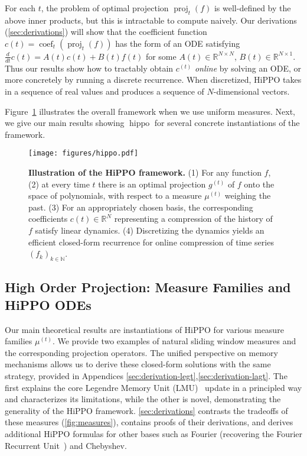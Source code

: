 \documentclass{article}
\newcommand{\R}{\mathbb{R}}
\newcommand{\N}{\mathbb{N}}
\DeclareMathOperator{\proj}{proj}
\DeclareMathOperator{\coef}{coef}
\DeclareMathOperator{\hippo}{hippo}
\begin{document}
For each $t$, the problem of optimal projection
$\proj_t(f)$ is well-defined by the above inner products,
but this is intractable to compute naively.
Our derivations (\cref{sec:derivations}) will show that
the coefficient function $c(t) = \coef_t(\proj_t(f))$ has the form of an ODE
satisfying $\frac{d}{dt} c(t) = A(t) c(t) + B(t) f(t)$ for some $A(t) \in \R^{N \times N}$, $B(t) \in \R^{N \times 1}$.
Thus our results show how to tractably obtain $c^{(t)}$ \emph{online} by solving an
ODE, or more concretely by running a discrete recurrence.
When discretized, HiPPO takes in a sequence of real values and produces a
sequence of $N$-dimensional vectors.






Figure~\ref{fig:framework} illustrates the overall framework when we use uniform measures.
Next, we give our main results showing $\hippo$ for several concrete instantiations of the framework.

\begin{figure}
  \centering
  \texttt{[image: figures/hippo.pdf]}
  \caption{
    \textbf{Illustration of the HiPPO framework.}
    (1) For any function $f$, (2) at every time $t$ there is an optimal projection $g^{(t)}$ of $f$ onto the space of polynomials, with respect to a measure $\mu^{(t)}$ weighing the past.
    (3) For an appropriately chosen basis, the corresponding coefficients $c(t)\in\R^N$ representing a compression of the history of $f$ satisfy linear dynamics.
    (4) Discretizing the dynamics yields an efficient closed-form recurrence for online compression of time series $(f_k)_{k\in\N}$.
  }
  \label{fig:framework}
\end{figure}


\subsection{High Order Projection: Measure Families and HiPPO ODEs}
\label{subsec:high_order_projection}

Our main theoretical results are instantiations of HiPPO for various measure families $\mu^{(t)}$.
We provide two examples of natural sliding window measures and the corresponding projection operators.
The unified perspective on memory mechanisms allows us to derive these closed-form solutions with the same strategy, provided in
Appendices \ref{sec:derivation-legt},\ref{sec:derivation-lagt}.
The first explains the core Legendre Memory Unit (LMU)~\citep{voelker2019legendre} update in a principled way and characterizes its limitations,
while the other is novel, demonstrating the generality of the HiPPO framework.
\cref{sec:derivations} contrasts the tradeoffs of these measures
(\cref{fig:measures}), contains proofs of their derivations, and derives
additional HiPPO formulas for other bases such as Fourier (recovering the
Fourier Recurrent Unit~\citep{zhang2018learning}) and Chebyshev.
\end{document}
